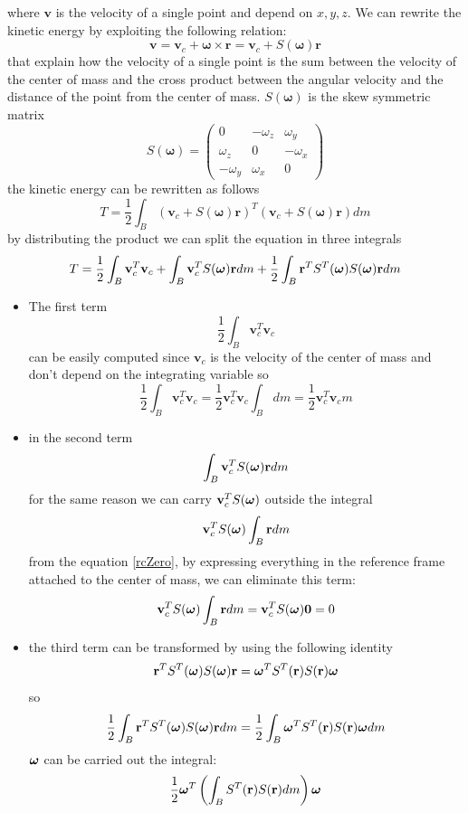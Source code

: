 \documentclass[10pt, a4paper]{report}
\begin{document}
where $\mathbf v$ is the velocity of a single point and depend on $x,y,z$. We can rewrite the kinetic energy by exploiting the following relation:\begin{equation}
    \mathbf v = \mathbf v_c+\boldsymbol\omega\times \mathbf r=\mathbf v_c+S(\boldsymbol\omega)\mathbf r
\end{equation}
that explain how the velocity of a single point is the sum between the velocity of the center of mass and the cross product between the angular velocity and the distance of the point from the center of mass. $S(\boldsymbol\omega)$ is the skew symmetric matrix\begin{equation}
    S(\boldsymbol\omega)=\begin{pmatrix}
        0&-\omega_z&\omega_y\\ 
        \omega_z&0&-\omega_x\\ 
        -\omega_y&\omega_x&0
    \end{pmatrix}
\end{equation}
the kinetic energy can be rewritten as follows\begin{equation}
    T=\frac{1}{2}\int_B(\mathbf v_c+S(\boldsymbol\omega)\mathbf r)^T(\mathbf v_c+S(\boldsymbol\omega)\mathbf r)dm
\end{equation}
by distributing the product we can split the equation in three integrals\begin{equation}
    T=\frac{1}{2}\int_B \mathbf v_c^T\mathbf v_c+
    \int_B\mathbf v_c^TS({\boldsymbol{\omega}})\mathbf rdm+\frac{1}{2}\int_B\mathbf r^TS^T({\boldsymbol{\omega}})S({\boldsymbol{\omega}})\mathbf rdm
\end{equation}\begin{itemize}
    \item The first term$$\frac{1}{2}\int_B \mathbf v_c^T\mathbf v_c$$
    can be easily computed since $\mathbf v_c$ is the velocity of the center of mass and don't depend on the integrating variable so$$
    \frac{1}{2}\int_B \mathbf v_c^T\mathbf v_c=\frac{1}{2}\mathbf v_c^T\mathbf v_c\int_Bdm=\frac{1}{2}\mathbf v_c^T\mathbf v_cm$$
    \item in the second term 
    $$  \int_B\mathbf v_c^TS({\boldsymbol{\omega}})\mathbf rdm $$ 
    for the same reason we can carry $\mathbf v_c^TS({\boldsymbol{\omega}})$ outside the integral
    $$  \mathbf v_c^TS({\boldsymbol{\omega}})\int_B\mathbf rdm $$ 
    from the equation \eqref{rcZero}, by expressing everything in the reference frame attached to the center of mass, we can eliminate this term:
     $$  \mathbf v_c^TS({\boldsymbol{\omega}})\int_B\mathbf rdm = \mathbf v_c^TS({\boldsymbol{\omega}})\mathbf 0= 0 $$ 
     \item the third term can be transformed by using the following identity
     $$
     \mathbf r^TS^T({\boldsymbol{\omega}})S({\boldsymbol{\omega}})\mathbf r=
     {\boldsymbol{\omega}}^TS^T(\mathbf r)S(\mathbf r){\boldsymbol{\omega}}
     $$
     so 
     $$ 
     \frac{1}{2}\int_B\mathbf r^TS^T({\boldsymbol{\omega}})S({\boldsymbol{\omega}})\mathbf rdm=
     \frac{1}{2}\int_B{\boldsymbol{\omega}}^TS^T(\mathbf r)S(\mathbf r){\boldsymbol{\omega}} dm
     $$
     ${\boldsymbol{\omega}}$ can be carried out the integral:
     $$
     \frac{1}{2}{\boldsymbol{\omega}}^T\left(\int_BS^T(\mathbf r)S(\mathbf r) dm\right){\boldsymbol{\omega}}
     $$
\end{itemize}
\end{document}
